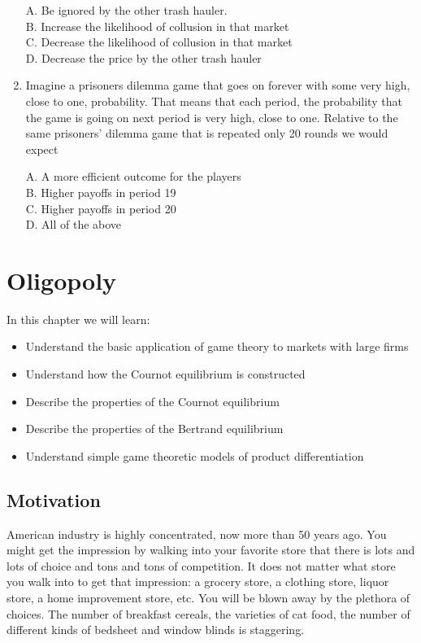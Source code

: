 \documentclass[
]{book}
\providecommand{\tightlist}{%
  \setlength{\itemsep}{0pt}\setlength{\parskip}{0pt}}
\begin{document}
\begin{enumerate}
  A. Be ignored by the other trash hauler.\\
  B. Increase the likelihood of collusion in that market\\
  C. Decrease the likelihood of collusion in that market\\
  D. Decrease the price by the other trash hauler
\item
  Imagine a prisoners dilemma game that goes on forever with some very high, close to one, probability. That means that each period, the probability that the game is going on next period is very high, close to one. Relative to the same prisoners' dilemma game that is repeated only 20 rounds we would expect

  A. A more efficient outcome for the players\\
  B. Higher payoffs in period 19\\
  C. Higher payoffs in period 20\\
  D. All of the above
\end{enumerate}

\hypertarget{oligopoly}{%
\chapter{Oligopoly}\label{oligopoly}}

In this chapter we will learn:

\begin{itemize}
\tightlist
\item
  Understand the basic application of game theory to markets with large firms
\item
  Understand how the Cournot equilibrium is constructed
\item
  Describe the properties of the Cournot equilibrium
\item
  Describe the properties of the Bertrand equilibrium
\item
  Understand simple game theoretic models of product differentiation
\end{itemize}

\hypertarget{motivation-1}{%
\section{Motivation}\label{motivation-1}}

American industry is highly concentrated, now more than 50 years ago. You might get the impression by walking into your favorite store that there is lots and lots of choice and tons and tons of competition. It does not matter what store you walk into to get that impression: a grocery store, a clothing store, liquor store, a home improvement store, etc. You will be blown away by the plethora of choices. The number of breakfast cereals, the varieties of cat food, the number of different kinds of bedsheet and window blinds is staggering.
\end{document}
